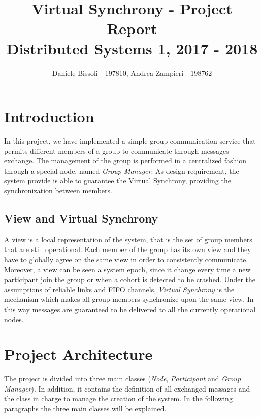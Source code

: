 \documentclass[11pt]{article}
\title{\LARGE{\textbf{Virtual Synchrony - Project Report}\\[0mm]\large{Distributed Systems 1, 2017 - 2018}}}
\author{Daniele Bissoli - 197810, Andrea Zampieri - 198762}
\date{}
\begin{document}
	\maketitle
	
	\section{Introduction}
	In this project, we have implemented a simple group communication service that permits different members of a group to communicate through messages exchange. The management of the group is performed in a centralized fashion through a special node, named \textit{Group Manager}. As design requirement, the system provide is able to guarantee the Virtual Synchrony, providing the synchronization between members.
	
	\subsection{View and Virtual Synchrony}
	A view is a local representation of the system, that is the set of group members that are still operational. Each member of the group has its own view and they have to globally agree on the same view in order to consistently communicate. Moreover, a view can be seen a system epoch, since it change every time a new participant join the group or when a cohort is detected to be crashed.
	Under the assumptions of reliable links and FIFO channels, \textit{Virtual Synchrony} is the mechanism which makes all group members synchronize upon the same view. In this way messages are guaranteed to be delivered to all the currently operational nodes.
	
	\section{Project Architecture}
	The project is divided into three main classes (\textit{Node}, \textit{Participant} and \textit{Group Manager}). In addition, it contains the definition of all exchanged messages and the class in charge to manage the creation of the system. In the following paragraphs the three main classes will be explained.
	
\end{document}

